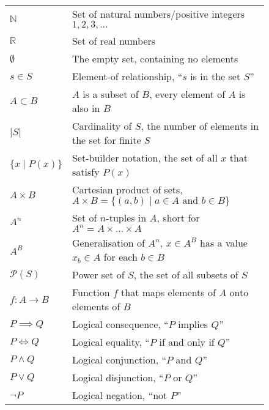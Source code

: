 \begin{figure}[h]
    \centering
    \begin{tabular}{ll}
        $\mathbb N$        & Set of natural numbers/positive integers $1,2,3,\dots$\\
        $\mathbb R$        & Set of real numbers\\
        $\emptyset$        & The empty set, containing no elements\\[1em]
        $s\in S$           & Element-of relationship, ``$s$ is in the set $S$''\\
        $A\subset B$       & $A$ is a subset of $B$, every element of $A$ is also in $B$\\
        $|S|$              & Cardinality of $S$, the number of elements in the set for finite $S$\\
        $\{x\mid P(x)\}$   & Set-builder notation, the set of all $x$ that satisfy $P(x)$\\
        $A\times B$        & Cartesian product of sets, $A\times B=\{(a,b)\mid a\in A\text{ and }b\in B\}$\\
        $A^n$              & Set of $n$-tuples in $A$, short for $A^n=A\times\dots\times A$\\
        $A^B$              & Generalisation of $A^n$, $x\in A^B$ has a value $x_b\in A$ for each $b\in B$\\
        $\mathcal P(S)$    & Power set of $S$, the set of all subsets of $S$\\
        $f:A\rightarrow B$ & Function $f$ that maps elements of $A$ onto elements of $B$\\[1em]
        $P\implies Q$      & Logical consequence, ``$P$ implies $Q$''\\
        $P\iff Q$          & Logical equality, ``$P$ if and only if $Q$''\\
        $P\mathrel\land Q$ & Logical conjunction, ``$P$ and $Q$''\\
        $P\mathrel\lor Q$  & Logical disjunction, ``$P$ or $Q$''\\
        $\neg P$           & Logical negation, ``not $P$''
    \end{tabular}
\end{figure}